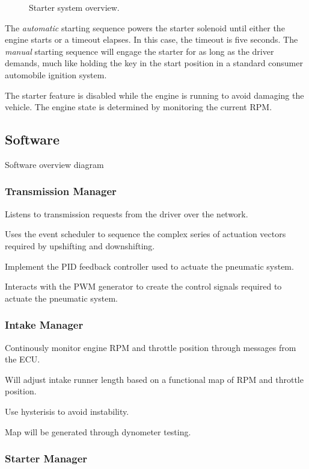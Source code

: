 \begin{figure}[H]
\centering
%
\caption{Starter system overview.}
\label{fig:starter_system_overview}
\end{figure}

The \emph{automatic} starting sequence powers the starter solenoid until either the engine starts or a timeout elapses. In this case, the timeout is five seconds. The \emph{manual} starting sequence will engage the starter for as long as the driver demands, much like holding the key in the start position in a standard consumer automobile ignition system. 

The starter feature is disabled while the engine is running to avoid damaging the vehicle. The engine state is determined by monitoring the current RPM.

\subsection{Software}

Software overview diagram


\subsubsection{Transmission Manager}

Listens to transmission requests from the driver over the network.

Uses the event scheduler to sequence the complex series of actuation
vectors required by upshifting and downshifting.

Implement the PID feedback controller used to actuate the pneumatic
system.

Interacts with the PWM generator to create the control signals required
to actuate the pneumatic system.


\subsubsection{Intake Manager}

Continously monitor engine RPM and throttle position through messages
from the ECU.

Will adjust intake runner length based on a functional map of RPM
and throttle position.

Use hysterisis to avoid instability.

Map will be generated through dynometer testing.


\subsubsection{Starter Manager}

